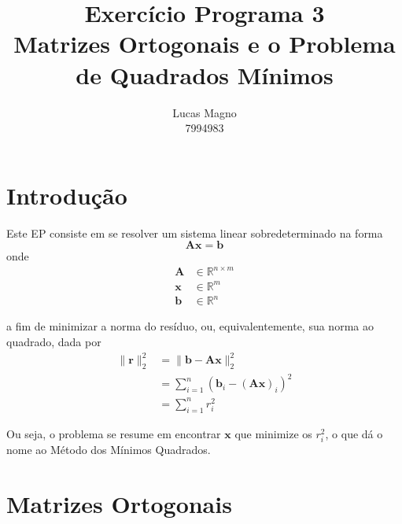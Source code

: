 \documentclass[a4paper,11pt]{article}
\date{}
\author{Lucas Magno \\ 7994983}
\title{Exercício Programa 3 \\ Matrizes Ortogonais e o Problema de Quadrados Mínimos}
\begin{document}
    \maketitle

    \section*{Introdução}
    Este EP consiste em se resolver um sistema linear sobredeterminado na forma
    $$ \mathbf{Ax} = \mathbf{b} $$
    onde
    \begin{align*}
        \mathbf{A} & \in \mathbb{R}^{n\times m}\\
        \mathbf{x} & \in \mathbb{R}^{m} \\
        \mathbf{b} & \in \mathbb{R}^{n}
    \end{align*}

    a fim de minimizar a norma do resíduo, ou, equivalentemente, sua norma ao quadrado, dada por
    \begin{align*}
        \| \mathbf{r} \|_2^2 &= \| \mathbf{b} - \mathbf{Ax} \|_2^2 \\
                             &= \sum_{i = 1}^n (\mathbf{b}_i - \mathbf{(Ax)}_i)^2 \\
                             &= \sum_{i = 1}^n r_i^2
    \end{align*}

    Ou seja, o problema se resume em encontrar $\mathbf{x}$ que minimize os $r_i^2$, o que dá o nome ao Método dos Mínimos Quadrados.

    \section*{Matrizes Ortogonais}
\end{document}
